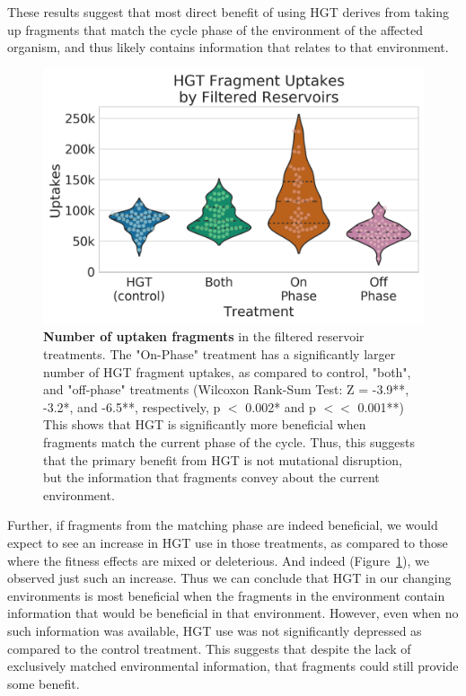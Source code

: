 \documentclass[letterpaper]{article}
\begin{document}
These results suggest that most direct benefit of using HGT derives from taking up fragments that match the cycle phase of the environment of the affected organism, and thus likely contains information that relates to that environment. %
	\begin{figure}[h!]
	\begin{center}
	\includegraphics[width=0.75\columnwidth]{figures/hgt_use_by_cycle_phase_source.png}
	\caption{\textbf{Number of uptaken fragments} in the filtered reservoir treatments. The "On-Phase" treatment has a significantly larger number of HGT fragment uptakes, as compared to control, "both", and "off-phase" treatments (Wilcoxon Rank-Sum Test: Z = -3.9**, -3.2*, and -6.5**, respectively, p $<$ 0.002* and p $<<$ 0.001**) This shows that HGT is significantly more beneficial when fragments match the current phase of the cycle. Thus, this suggests that the primary benefit from HGT is not mutational disruption, but the information that fragments convey about the current environment.
	}\label{fig:hgt_use_by_cycle_phase_source}
	\end{center}
	\end{figure}
Further, if fragments from the matching phase are indeed beneficial, we would expect to see an increase in HGT use in those treatments, as compared to those where the fitness effects are mixed or deleterious. And indeed (Figure~\ref{fig:hgt_use_by_cycle_phase_source}), we observed just such an increase. Thus we can conclude that HGT in our changing environments is most beneficial when the fragments in the environment contain information that would be beneficial in that environment. However, even when no such information was available, HGT use was not significantly depressed as compared to the control treatment. This suggests that despite the lack of exclusively matched environmental information, that fragments could still provide some benefit. 
\end{document}
